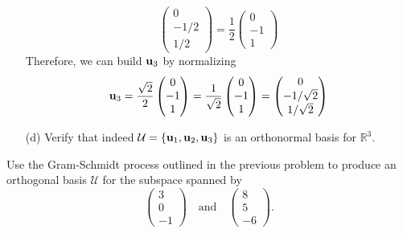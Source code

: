 \begin{problem}
\begin{enumerate}
{\[                    \begin{pmatrix} 0 \\ -1/2 \\ 1/2 \end{pmatrix} =
                        \frac{1}{2} \begin{pmatrix}0\\-1\\1\end{pmatrix} \]
    Therefore, we can build ${\bf u}_3$ by normalizing
    \[ {\bf u}_3 = \frac{\sqrt{2}}{2} \begin{pmatrix} 0\\-1\\1 \end{pmatrix}  =
            \frac{1}{\sqrt{2}} \begin{pmatrix} 0\\-1\\1\end{pmatrix} = \begin{pmatrix}
                0\\-1/\sqrt{2} \\ 1/\sqrt{2} \end{pmatrix}\]
}
        \item[(d)] Verify that indeed $\mathcal{U} = \{{\bf u}_1, {\bf u}_2, {\bf u}_3\}$ is an
            orthonormal basis for $\mathbb{R}^3$.
    \end{enumerate}
\end{problem}


\begin{problem}
    Use the Gram-Schmidt process outlined in the previous problem to produce an orthogonal
    basis $\mathcal{U}$ for the subspace spanned by
    \[ \begin{pmatrix} 3\\0\\-1\end{pmatrix} \quad \text{and} \quad \begin{pmatrix}
            8\\5\\-6\end{pmatrix}. \]
\end{problem}


